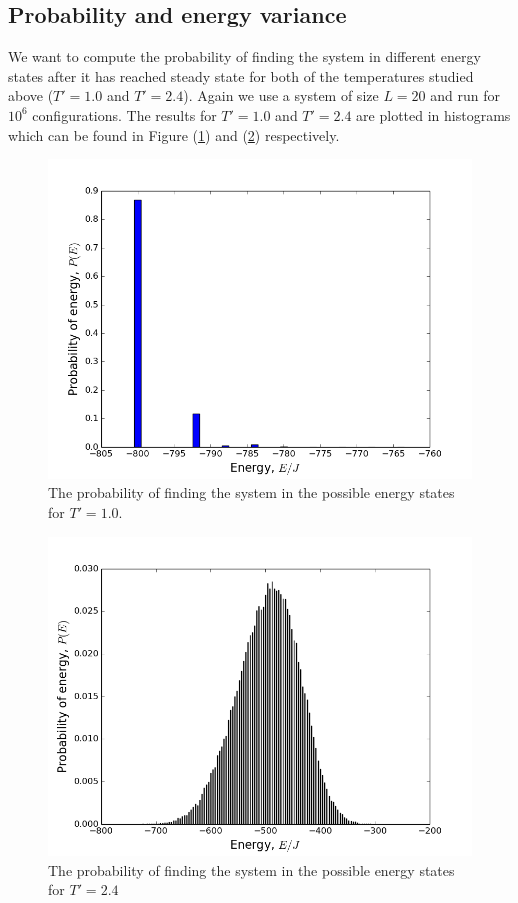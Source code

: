 \documentclass[norsk,a4paper,12pt]{article}
\begin{document}
\subsection{Probability and energy variance}
We want to compute the probability of finding the system in different energy states after it has reached steady state for both of the temperatures studied above ($T'=1.0$ and $T'=2.4$). Again we use a system of size $L=20$ and run for $10^6$ configurations. The results for $T'=1.0$ and $T'=2.4$ are plotted in histograms which can be found in Figure (\ref{4c_prob_t=1}) and (\ref{4c_prob_t=2.4}) respectively. 
\begin{figure}[h]
\centering
\includegraphics[width=120mm]{plot_4d_prob_T=1_0_N=1e6.png}
\caption{The probability of finding the system in the possible energy states for $T'=1.0$.\label{4c_prob_t=1}}
\end{figure}
\begin{figure}[h]
\centering
\includegraphics[width=120mm]{plot_4d_prob_T=2_4_N=1e6.png}
\caption{The probability of finding the system in the possible energy states for $T'=2.4$ \label{4c_prob_t=2.4}}
\end{figure}
\end{document}
